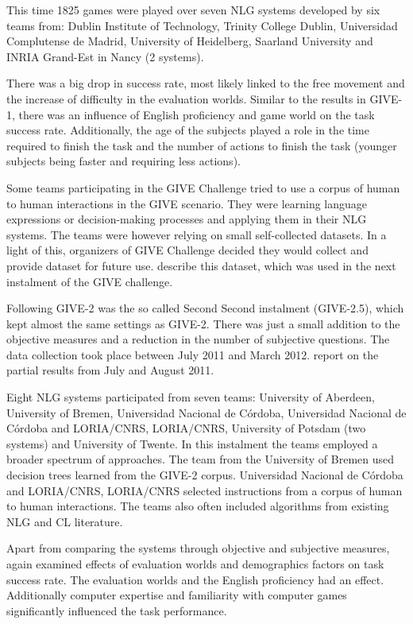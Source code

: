 This time 1825 games were played over seven NLG systems developed by six teams from: Dublin Institute of Technology, Trinity College Dublin, Universidad Complutense de Madrid, University of Heidelberg, Saarland University and INRIA Grand-Est in Nancy (2 systems).

There was a big drop in success rate, most likely linked to the free movement and the increase of difficulty in the evaluation worlds. Similar to the results in GIVE-1, there was an influence of English proficiency and game world on the task success rate. Additionally, the age of the subjects played a role in the time required to finish the task and the number of actions to finish the task (younger subjects being faster and requiring less actions).

Some teams participating in the GIVE Challenge tried to use a corpus of human to human interactions in the GIVE scenario. They were learning language expressions or decision-making processes and applying them in their NLG systems. The teams were however relying on small self-collected datasets. In a light of this, organizers of GIVE Challenge decided they would collect and provide dataset for future use. \citet{gargett2010give} describe this dataset, which was used in the next instalment of the GIVE challenge.

Following GIVE-2 was the so called Second Second instalment (GIVE-2.5), which kept almost the same settings as GIVE-2. There was just a small addition to the objective measures and a reduction in the number of subjective questions. The data collection took place between July 2011 and March 2012. \citet{striegnitz2011report} report on the partial results from July and August 2011.

Eight NLG systems participated from seven teams: University of Aberdeen, University of Bremen, Universidad Nacional de Córdoba, Universidad Nacional de Córdoba and LORIA/CNRS, LORIA/CNRS, University of Potsdam (two systems) and University of Twente. In this instalment the teams employed a broader spectrum of approaches. The team from the University of Bremen used decision trees learned from the GIVE-2 corpus. Universidad Nacional de Córdoba and LORIA/CNRS, LORIA/CNRS selected instructions from a corpus of human to human interactions. The teams also often included algorithms from existing NLG and CL literature.

Apart from comparing the systems through objective and subjective measures, \citet{striegnitz2011report} again examined effects of evaluation worlds and demographics factors on task success rate. The evaluation worlds and the English proficiency had an effect. Additionally computer expertise and familiarity with computer games significantly influenced the task performance.

